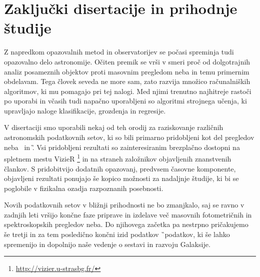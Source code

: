 \section{Zaključki disertacije in prihodnje študije}
\label{sec:slo_zakljucek}
Z napredkom opazovalnih metod in observatorijev se počasi spreminja tudi opazovalno delo astronomije. Očiten premik se vrši v smeri proč od dolgotrajnih analiz posameznih objektov proti masovnim pregledom neba in temu primernim obdelavam. Tega človek seveda ne more sam, zato razvija množico računalniških algoritmov, ki mu pomagajo pri tej nalogi. Med njimi trenutno najhitreje rastoči po uporabi in včasih tudi napačno uporabljeni so algoritmi strojnega učenja, ki upravljajo naloge klasifikacije, grozdenja in regresije.

V disertaciji smo uporabili nekaj od teh orodij za raziskovanje različnih astronomskih podatkovnih setov, ki so bili primarno pridobljeni kot del pregledov neba \Gh\ in \G. Vsi pridobljeni rezultati so zainteresiranim brezplačno dostopni na spletnem mestu VizieR \footnote{\url{http://vizier.u-strasbg.fr/}} in na straneh založnikov objavljenih znanstvenih člankov. S pridobitvijo dodatnih opazovanj, predvsem časovne komponente, objavljeni rezultati ponujajo še kopico možnosti za nadaljnje študije, ki bi se poglobile v fizikalna ozadja razpoznanih posebnosti.

Novih podatkovnih setov v bližnji prihodnosti ne bo zmanjkalo, saj se ravno v zadnjih leti vršijo končne faze priprave in izdelave več masovnih fotometričnih in spektroskopskih pregledov neba. Do njihovega začetka pa nestrpno pričakujemo še tretji in za tem posledično končni izid podatkov \G\ podatkov, ki še lahko spremenijo in dopolnijo naše vedenje o sestavi in razvoju Galaksije.